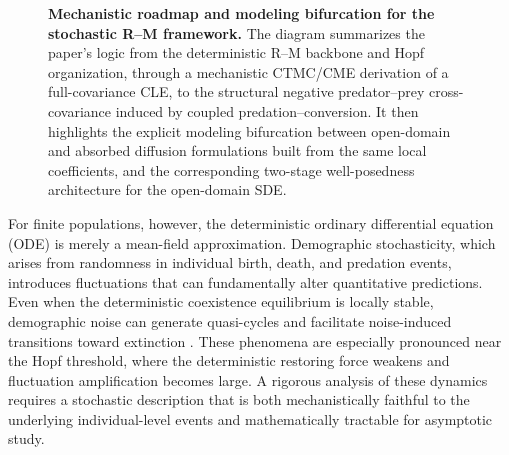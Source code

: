 \documentclass[pdflatex,sn-mathphys-ay]{sn-jnl}
\theoremstyle{thmstyleone}
\theoremstyle{definition}
\theoremstyle{remark}
\begin{document}
\begin{figure}[p]

\caption{\textbf{Mechanistic roadmap and modeling bifurcation for the stochastic R--M framework.}
The diagram summarizes the paper's logic from the deterministic R--M backbone and Hopf organization, through a mechanistic CTMC/CME derivation of a full-covariance CLE, to the structural negative predator--prey cross-covariance induced by coupled predation--conversion. It then highlights the explicit modeling bifurcation between open-domain and absorbed diffusion formulations built from the same local coefficients, and the corresponding two-stage well-posedness architecture for the open-domain SDE.}
\label{fig:mechanism_summary_tikz}
\end{figure}

For finite populations, however, the deterministic ordinary differential equation (ODE) is merely a mean-field approximation. 
Demographic stochasticity, which arises from randomness in individual birth, death, and predation events, introduces fluctuations that can fundamentally alter quantitative predictions. 
Even when the deterministic coexistence equilibrium is locally stable, demographic noise can generate quasi-cycles and facilitate noise-induced transitions toward extinction \citep{mckane_predator-prey_2005,pinedakrch_tale_2007,black_stochastic_2012}. 
These phenomena are especially pronounced near the Hopf threshold, where the deterministic restoring force weakens and fluctuation amplification becomes large.
A rigorous analysis of these dynamics requires a stochastic description that is both mechanistically faithful to the underlying individual-level events and mathematically tractable for asymptotic study.
\end{document}
